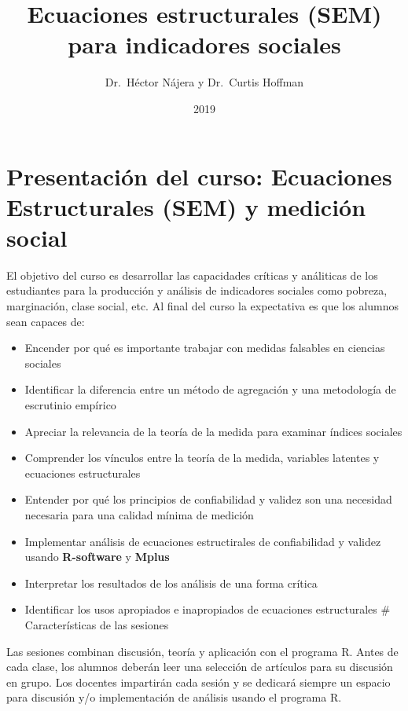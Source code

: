 \documentclass[11pt,]{article}
\title{Ecuaciones estructurales (SEM) para indicadores sociales}
\author{Dr.~Héctor Nájera y Dr.~Curtis Hoffman}
\date{2019}
\providecommand{\tightlist}{%
  \setlength{\itemsep}{0pt}\setlength{\parskip}{0pt}}
\begin{document}
\maketitle

{
\setcounter{tocdepth}{2}
\tableofcontents
}
\newpage

\hypertarget{presentacion-del-curso-ecuaciones-estructurales-sem-y-medicion-social}{%
\section{Presentación del curso: Ecuaciones Estructurales (SEM) y
medición
social}\label{presentacion-del-curso-ecuaciones-estructurales-sem-y-medicion-social}}

El objetivo del curso es desarrollar las capacidades críticas y
análiticas de los estudiantes para la producción y análisis de
indicadores sociales como pobreza, marginación, clase social, etc. Al
final del curso la expectativa es que los alumnos sean capaces de:

\begin{itemize}
\tightlist
\item
  Encender por qué es importante trabajar con medidas falsables en
  ciencias sociales
\item
  Identificar la diferencia entre un método de agregación y una
  metodología de escrutinio empírico
\item
  Apreciar la relevancia de la teoría de la medida para examinar índices
  sociales
\item
  Comprender los vínculos entre la teoría de la medida, variables
  latentes y ecuaciones estructurales
\item
  Entender por qué los principios de confiabilidad y validez son una
  necesidad necesaria para una calidad mínima de medición
\item
  Implementar análisis de ecuaciones estructirales de confiabilidad y
  validez usando \textbf{R-software} y \textbf{Mplus}
\item
  Interpretar los resultados de los análisis de una forma crítica
\item
  Identificar los usos apropiados e inapropiados de ecuaciones
  estructurales \# Características de las sesiones
\end{itemize}

Las sesiones combinan discusión, teoría y aplicación con el programa R.
Antes de cada clase, los alumnos deberán leer una selección de artículos
para su discusión en grupo. Los docentes impartirán cada sesión y se
dedicará siempre un espacio para discusión y/o implementación de
análisis usando el programa R.
\end{document}
